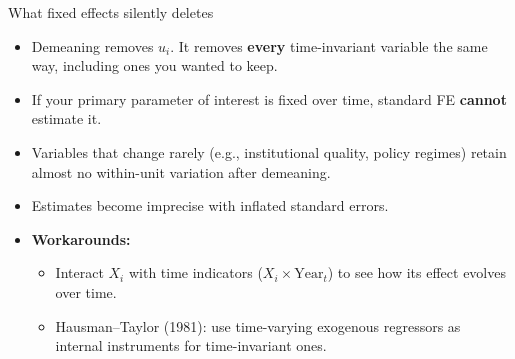 \documentclass[
  11pt,
  ignorenonframetext,
  aspectratio=169,
]{beamer}
\providecommand{\tightlist}{%
  \setlength{\itemsep}{0pt}\setlength{\parskip}{0pt}}
\begin{document}
\begin{frame}{What fixed effects silently deletes}
\protect{}\label{what-fixed-effects-silently-deletes}
\begin{itemize}
\tightlist
\item
  Demeaning removes \(u_i\). It removes \textbf{every} time-invariant
  variable the same way, including ones you wanted to keep.
\item
  If your primary parameter of interest is fixed over time, standard FE
  \textbf{cannot} estimate it.
\end{itemize}

\vspace{0.4em}

\begin{itemize}
\tightlist
\item
  Variables that change rarely (e.g., institutional quality, policy
  regimes) retain almost no within-unit variation after demeaning.
\item
  Estimates become imprecise with inflated standard errors.
\end{itemize}

\vspace{0.4em}

\begin{itemize}
\tightlist
\item
  \textbf{Workarounds:}

  \begin{itemize}
  \tightlist
  \item
    Interact \(X_i\) with time indicators (\(X_i \times \text{Year}_t\))
    to see how its effect evolves over time.
  \item
    Hausman--Taylor (1981): use time-varying exogenous regressors as
    internal instruments for time-invariant ones.
  \end{itemize}
\end{itemize}
\end{frame}
\end{document}
